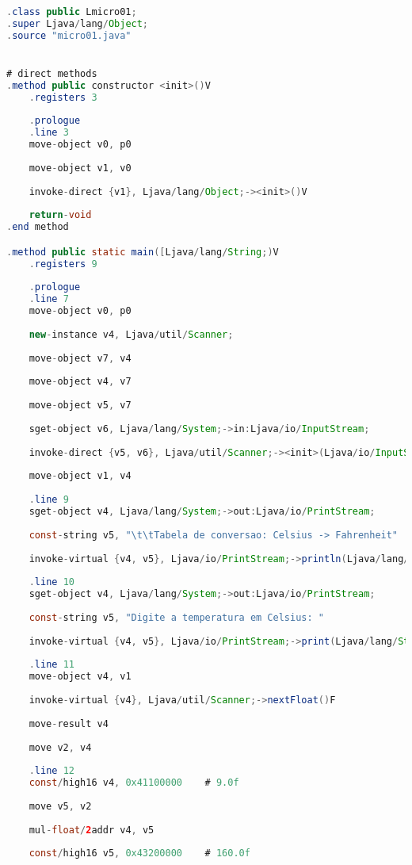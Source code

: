 \documentclass[hidelinks,12pt]{article}
\begin{document}
	\begin{lstlisting}[caption=Smali resultante do .java,language=java]
.class public Lmicro01;
.super Ljava/lang/Object;
.source "micro01.java"


# direct methods
.method public constructor <init>()V
	.registers 3
	
	.prologue
	.line 3
	move-object v0, p0
	
	move-object v1, v0
	
	invoke-direct {v1}, Ljava/lang/Object;-><init>()V
	
	return-void
.end method

.method public static main([Ljava/lang/String;)V
	.registers 9
	
	.prologue
	.line 7
	move-object v0, p0
	
	new-instance v4, Ljava/util/Scanner;
	
	move-object v7, v4
	
	move-object v4, v7
	
	move-object v5, v7
	
	sget-object v6, Ljava/lang/System;->in:Ljava/io/InputStream;
	
	invoke-direct {v5, v6}, Ljava/util/Scanner;-><init>(Ljava/io/InputStream;)V
	
	move-object v1, v4
	
	.line 9
	sget-object v4, Ljava/lang/System;->out:Ljava/io/PrintStream;
	
	const-string v5, "\t\tTabela de conversao: Celsius -> Fahrenheit"
	
	invoke-virtual {v4, v5}, Ljava/io/PrintStream;->println(Ljava/lang/String;)V
	
	.line 10
	sget-object v4, Ljava/lang/System;->out:Ljava/io/PrintStream;
	
	const-string v5, "Digite a temperatura em Celsius: "
	
	invoke-virtual {v4, v5}, Ljava/io/PrintStream;->print(Ljava/lang/String;)V
	
	.line 11
	move-object v4, v1
	
	invoke-virtual {v4}, Ljava/util/Scanner;->nextFloat()F
	
	move-result v4
	
	move v2, v4
	
	.line 12
	const/high16 v4, 0x41100000    # 9.0f
	
	move v5, v2
	
	mul-float/2addr v4, v5
	
	const/high16 v5, 0x43200000    # 160.0f
	

\end{lstlisting}
\end{document}
